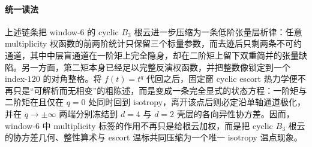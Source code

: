 \paragraph{统一读法}
上述链条把 window-\(6\) 的 cyclic \(B_3\) 根云进一步压缩为一条低阶张量层析律：任意 multiplicity 权函数的前两阶统计只保留三个标量参数，而去迹后只剩两条不可约通道，其中中层盲通道在一阶矩上完全隐身，却在二阶矩上留下双重简并的张量缺陷。另一方面，第二矩本身已经足以完整反演权函数，并把整数像锁定到一个 index-\(120\) 的对角整格。将 \(f(t)=t^q\) 代回之后，固定窗 cyclic escort 热力学便不再只是“可解析而无相变”的粗陈述，而是变成一条完全显式的状态方程：一阶矩与二阶矩在且仅在 \(q=0\) 处同时回到 isotropy，离开该点后则必定沿单轴通道极化，并在 \(q\to\pm\infty\) 两端分别冻结到 \(d=4\) 与 \(d=2\) 壳层的各向异性协方差。因而，window-\(6\) 中 multiplicity 标签的作用不再只是给根云加权，而是把 cyclic \(B_3\) 根云的协方差几何、整性算术与 escort 温标共同压缩为一个唯一 isotropy 温点现象。

\endinput
